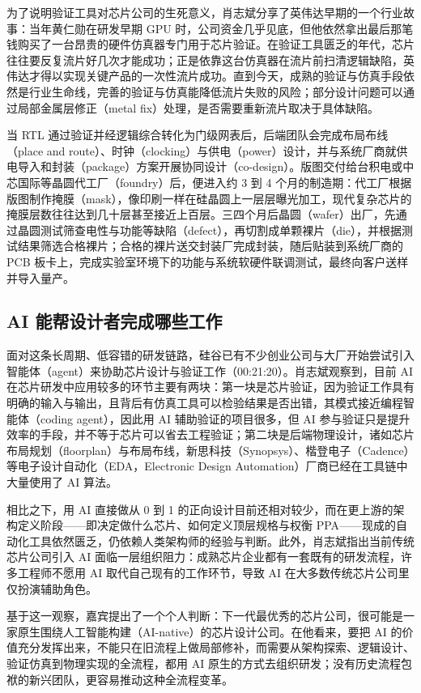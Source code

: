 \documentclass[UTF8,a4paper,11pt,fontset=fandol]{ctexart}
\begin{document}
为了说明验证工具对芯片公司的生死意义，肖志斌分享了英伟达早期的一个行业故事：当年黄仁勋在研发早期 GPU 时，公司资金几乎见底，但他依然拿出最后那笔钱购买了一台昂贵的硬件仿真器专门用于芯片验证。在验证工具匮乏的年代，芯片往往要反复流片好几次才能成功；正是依靠这台仿真器在流片前扫清逻辑缺陷，英伟达才得以实现关键产品的一次性流片成功。直到今天，成熟的验证与仿真手段依然是行业生命线，完善的验证与仿真能降低流片失败的风险；部分设计问题可以通过局部金属层修正（metal fix）处理，是否需要重新流片取决于具体缺陷。

当 RTL 通过验证并经逻辑综合转化为门级网表后，后端团队会完成布局布线（place and route）、时钟（clocking）与供电（power）设计，并与系统厂商就供电导入和封装（package）方案开展协同设计（co-design）。版图交付给台积电或中芯国际等晶圆代工厂（foundry）后，便进入约 3 到 4 个月的制造期：代工厂根据版图制作掩膜（mask），像印刷一样在硅晶圆上一层层曝光加工，现代复杂芯片的掩膜层数往往达到几十层甚至接近上百层。三四个月后晶圆（wafer）出厂，先通过晶圆测试筛查电性与功能等缺陷（defect），再切割成单颗裸片（die），并根据测试结果筛选合格裸片；合格的裸片送交封装厂完成封装，随后贴装到系统厂商的 PCB 板卡上，完成实验室环境下的功能与系统软硬件联调测试，最终向客户送样并导入量产。

\subsection{AI 能帮设计者完成哪些工作}
面对这条长周期、低容错的研发链路，硅谷已有不少创业公司与大厂开始尝试引入智能体（agent）来协助芯片设计与验证工作（00:21:20）。肖志斌观察到，目前 AI 在芯片研发中应用较多的环节主要有两块：第一块是芯片验证，因为验证工作具有明确的输入与输出，且背后有仿真工具可以检验结果是否出错，其模式接近编程智能体（coding agent），因此用 AI 辅助验证的项目很多，但 AI 参与验证只是提升效率的手段，并不等于芯片可以省去工程验证；第二块是后端物理设计，诸如芯片布局规划（floorplan）与布局布线，新思科技（Synopsys）、楷登电子（Cadence）等电子设计自动化（EDA，Electronic Design Automation）厂商已经在工具链中大量使用了 AI 算法。

相比之下，用 AI 直接做从 0 到 1 的正向设计目前还相对较少，而在更上游的架构定义阶段——即决定做什么芯片、如何定义顶层规格与权衡 PPA——现成的自动化工具依然匮乏，仍依赖人类架构师的经验与判断。此外，肖志斌指出当前传统芯片公司引入 AI 面临一层组织阻力：成熟芯片企业都有一套既有的研发流程，许多工程师不愿用 AI 取代自己现有的工作环节，导致 AI 在大多数传统芯片公司里仅扮演辅助角色。

基于这一观察，嘉宾提出了一个个人判断：下一代最优秀的芯片公司，很可能是一家原生围绕人工智能构建（AI-native）的芯片设计公司。在他看来，要把 AI 的价值充分发挥出来，不能只在旧流程上做局部修补，而需要从架构探索、逻辑设计、验证仿真到物理实现的全流程，都用 AI 原生的方式去组织研发；没有历史流程包袱的新兴团队，更容易推动这种全流程变革。
\end{document}
